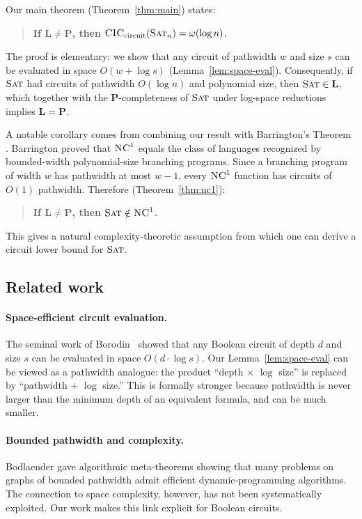 \documentclass[11pt]{article}
\newcommand{\SAT}{\textsc{Sat}}
\newcommand{\CIC}{\textsc{CIC}}
\newcommand{\NC}{\textsc{NC}}
\begin{document}
Our main theorem (Theorem~\ref{thm:main}) states:
\begin{quote}
  \textbf{If $\mathbf{L} \neq \mathbf{P}$, then
  $\CIC_{\text{circuit}}(\SAT_n) = \omega(\log n)$.}
\end{quote}
The proof is elementary: we show that any circuit of pathwidth $w$ and
size $s$ can be evaluated in space $O(w + \log s)$
(Lemma~\ref{lem:space-eval}).  Consequently, if $\SAT$ had circuits of
pathwidth $O(\log n)$ and polynomial size, then $\SAT \in \mathbf{L}$, which
together with the $\mathbf{P}$-completeness of $\SAT$ under log-space
reductions implies $\mathbf{L} = \mathbf{P}$.

A notable corollary comes from combining our result with Barrington's Theorem
\cite{Bar89}.  Barrington proved that $\NC^1$ equals the class of languages
recognized by bounded-width polynomial-size branching programs.  Since a
branching program of width $w$ has pathwidth at most $w-1$, every
$\NC^1$ function has circuits of $O(1)$ pathwidth.  Therefore
(Theorem~\ref{thm:nc1}):
\begin{quote}
  \textbf{If $\mathbf{L} \neq \mathbf{P}$, then $\SAT \notin \NC^1$.}
\end{quote}
This gives a natural complexity-theoretic assumption from which one can
derive a circuit lower bound for $\SAT$.

\subsection*{Related work}

\paragraph{Space-efficient circuit evaluation.}  The seminal work of
Borodin~\cite{Bor77} showed that any Boolean circuit of depth $d$ and size
$s$ can be evaluated in space $O(d \cdot \log s)$.  Our
Lemma~\ref{lem:space-eval} can be viewed as a pathwidth analogue: the
product ``depth $\times$ $\log$ size'' is replaced by ``pathwidth $+$
$\log$ size.''  This is formally stronger because pathwidth is never larger
than the minimum depth of an equivalent formula, and can be much smaller.

\paragraph{Bounded pathwidth and complexity.}  Bodlaender
\cite{Bod98} gave algorithmic meta-theorems showing that many problems on
graphs of bounded pathwidth admit efficient dynamic-programming algorithms.
The connection to space complexity, however, has not been systematically
exploited.  Our work makes this link explicit for Boolean circuits.
\end{document}
